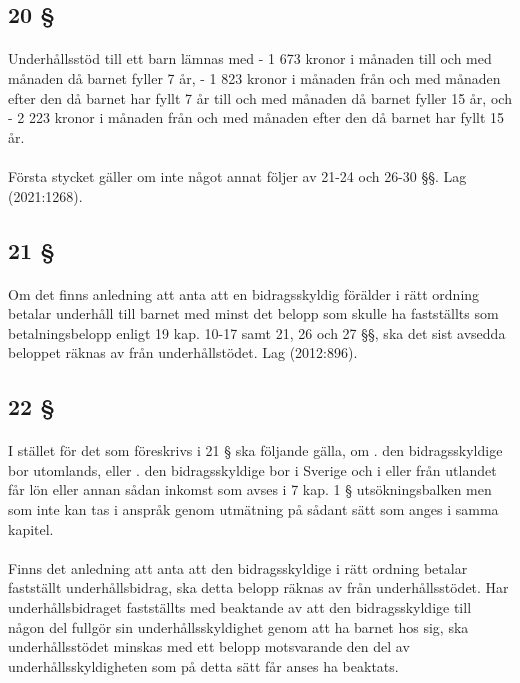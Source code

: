 \documentclass[a4paper,notitlepage,openany,10pt]{book}
\begin{document}
\subsection*{20 §}
\paragraph*{}
Underhållsstöd till ett barn lämnas med
\newline - 1 673 kronor i månaden till och med månaden då barnet fyller 7 år,
\newline - 1 823 kronor i månaden från och med månaden efter den då barnet har fyllt 7 år till och med månaden då barnet fyller 15 år, och
\newline - 2 223 kronor i månaden från och med månaden efter den då barnet har fyllt 15 år.
\paragraph*{}
Första stycket gäller om inte något annat följer av 21-24 och 26-30 §§.
Lag (2021:1268).
\subsection*{21 §}
\paragraph*{}
Om det finns anledning att anta att en bidragsskyldig förälder i rätt ordning betalar underhåll till barnet med minst det belopp som skulle ha fastställts som betalningsbelopp enligt 19 kap. 10-17 samt 21, 26 och 27 §§, ska det sist avsedda beloppet räknas av från underhållstödet.
Lag (2012:896).
\subsection*{22 §}
\paragraph*{}
I stället för det som föreskrivs i 21 § ska följande gälla, om
. den bidragsskyldige bor utomlands, eller
. den bidragsskyldige bor i Sverige och i eller från utlandet får lön eller annan sådan inkomst som avses i 7 kap. 1 § utsökningsbalken men som inte kan tas i anspråk genom utmätning på sådant sätt som anges i samma kapitel.
\paragraph*{}
Finns det anledning att anta att den bidragsskyldige i rätt ordning betalar fastställt underhållsbidrag, ska detta belopp räknas av från underhållsstödet. Har underhållsbidraget fastställts med beaktande av att den bidragsskyldige till någon del fullgör sin underhållsskyldighet genom att ha barnet hos sig, ska underhållsstödet minskas med ett belopp motsvarande den del av underhållsskyldigheten som på detta sätt får anses ha beaktats.
\end{document}
